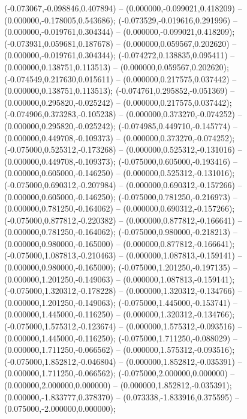  (-0.073067,-0.098846,0.407894) -- (0.000000,-0.099021,0.418209) -- (0.000000,-0.178005,0.543686);
 (-0.073529,-0.019616,0.291996) -- (0.000000,-0.019761,0.304344) -- (0.000000,-0.099021,0.418209);
 (-0.073931,0.059681,0.187678) -- (0.000000,0.059567,0.202620) -- (0.000000,-0.019761,0.304344);
 (-0.074272,0.138835,0.095411) -- (0.000000,0.138751,0.113513) -- (0.000000,0.059567,0.202620);
 (-0.074549,0.217630,0.015611) -- (0.000000,0.217575,0.037442) -- (0.000000,0.138751,0.113513);
 (-0.074761,0.295852,-0.051369) -- (0.000000,0.295820,-0.025242) -- (0.000000,0.217575,0.037442);
 (-0.074906,0.373283,-0.105238) -- (0.000000,0.373270,-0.074252) -- (0.000000,0.295820,-0.025242);
 (-0.074985,0.449710,-0.145774) -- (0.000000,0.449708,-0.109373) -- (0.000000,0.373270,-0.074252);
 (-0.075000,0.525312,-0.173268) -- (0.000000,0.525312,-0.131016) -- (0.000000,0.449708,-0.109373);
 (-0.075000,0.605000,-0.193416) -- (0.000000,0.605000,-0.146250) -- (0.000000,0.525312,-0.131016);
 (-0.075000,0.690312,-0.207984) -- (0.000000,0.690312,-0.157266) -- (0.000000,0.605000,-0.146250);
 (-0.075000,0.781250,-0.216973) -- (0.000000,0.781250,-0.164062) -- (0.000000,0.690312,-0.157266);
 (-0.075000,0.877812,-0.220382) -- (0.000000,0.877812,-0.166641) -- (0.000000,0.781250,-0.164062);
 (-0.075000,0.980000,-0.218213) -- (0.000000,0.980000,-0.165000) -- (0.000000,0.877812,-0.166641);
 (-0.075000,1.087813,-0.210463) -- (0.000000,1.087813,-0.159141) -- (0.000000,0.980000,-0.165000);
 (-0.075000,1.201250,-0.197135) -- (0.000000,1.201250,-0.149063) -- (0.000000,1.087813,-0.159141);
 (-0.075000,1.320312,-0.178228) -- (0.000000,1.320312,-0.134766) -- (0.000000,1.201250,-0.149063);
 (-0.075000,1.445000,-0.153741) -- (0.000000,1.445000,-0.116250) -- (0.000000,1.320312,-0.134766);
 (-0.075000,1.575312,-0.123674) -- (0.000000,1.575312,-0.093516) -- (0.000000,1.445000,-0.116250);
 (-0.075000,1.711250,-0.088029) -- (0.000000,1.711250,-0.066562) -- (0.000000,1.575312,-0.093516);
 (-0.075000,1.852812,-0.046804) -- (0.000000,1.852812,-0.035391) -- (0.000000,1.711250,-0.066562);
 (-0.075000,2.000000,0.000000) -- (0.000000,2.000000,0.000000) -- (0.000000,1.852812,-0.035391);
 (0.000000,-1.833777,0.378370) -- (0.073338,-1.833916,0.375595) -- (0.075000,-2.000000,0.000000);
